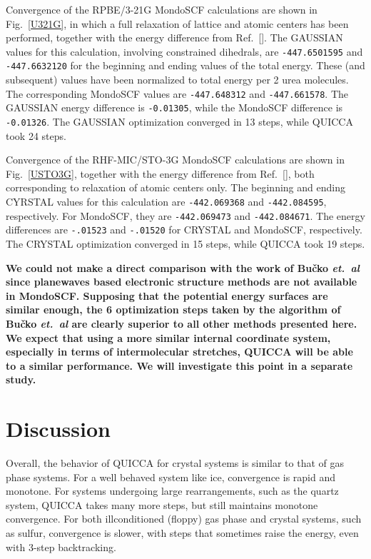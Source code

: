 \twolinestyle{\documentclass[prb,preprint]{revtex4}}
\begin{document}
Convergence of the RPBE/3-21G {\sc MondoSCF} calculations are shown in Fig.~\ref{U321G}, 
in which a full relaxation of lattice and atomic centers has been performed, together
with the energy difference from Ref.~[]. The {\sc GAUSSIAN} values for this 
calculation, involving constrained dihedrals, are {\tt -447.6501595} and {\tt -447.6632120} for the 
beginning and ending values of the total energy.  These (and subsequent) values have been normalized to 
total energy per 2 urea molecules.  The corresponding {\sc MondoSCF} values are {\tt -447.648312} 
and {\tt -447.661578}. The {\sc GAUSSIAN} energy difference is {\tt -0.01305}, while 
the {\sc MondoSCF} difference is {\tt -0.01326}.   The {\sc GAUSSIAN} optimization converged 
in 13 steps, while QUICCA took 24 steps.

Convergence of the RHF-MIC/STO-3G {\sc MondoSCF} calculations are shown in Fig.~\ref{USTO3G}, together
with the energy difference from Ref.~[], both corresponding to 
relaxation of atomic centers only.   The beginning and ending {\sc CYRSTAL} values for this 
calculation are {\tt -442.069368} and {\tt -442.084595}, respectively.  For {\sc MondoSCF},
they are {\tt -442.069473} and {\tt -442.084671}.  The energy differences are {\tt -.01523} and
{\tt -.01520} for {\sc CRYSTAL} and {\sc MondoSCF}, respectively.  The {\sc CRYSTAL} optimization
converged in 15 steps, while QUICCA took 19 steps.

{\bf
We could not make a direct comparison with the work of Bu\v{c}ko {\em et.~al} \cite{TBucko05}
since planewaves based electronic structure methods are not available in {\sc MondoSCF}.
Supposing that the potential energy surfaces are similar enough, 
the 6 optimization steps taken by the algorithm of Bu\v{c}ko {\em et.~al} 
are clearly superior to all other methods presented here.
We expect that using a more similar internal coordinate system, 
especially in terms of intermolecular stretches, QUICCA will
be able to a similar performance. We will investigate this point in a 
separate study.
}

\section{Discussion}\label{discussion}

Overall,  the behavior of QUICCA for crystal systems is similar to that of gas phase systems. 
For a well behaved system like ice, convergence is rapid and monotone. 
For systems undergoing large rearrangements, such as the quartz system, QUICCA
takes many more steps, but still maintains monotone convergence.
For both illconditioned (floppy)  gas phase and crystal systems, such as 
sulfur, convergence is slower, with steps that sometimes raise the energy, 
even with 3-step backtracking.
\end{document}
